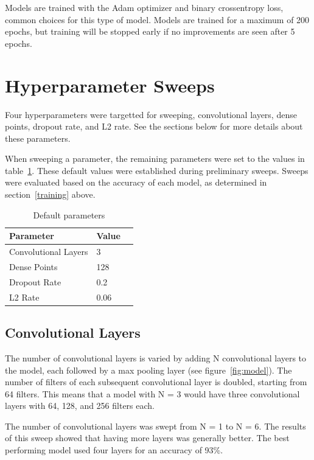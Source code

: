 \documentclass{article}
\begin{document}
Models are trained with the Adam optimizer and binary crossentropy loss, common choices for this type of model. Models are trained for a maximum of 200 epochs, but training will be stopped early if no improvements are seen after 5 epochs.


\section{Hyperparameter Sweeps}

Four hyperparameters were targetted for sweeping, convolutional layers, dense points, dropout rate, and L2 rate. See the sections below for more details about these parameters.

When sweeping a parameter, the remaining parameters were set to the values in table~\ref{parameters}. These default values were established during preliminary sweeps. Sweeps were evaluated based on the accuracy of each model, as determined in section~\ref{training} above. 

\begin{table}[H]
    \caption{Default parameters}
    \label{parameters}
    \centering
    \begin{tabular}{lll}
      \toprule
      Parameter     & Value  \\
      \midrule
      Convolutional Layers & 3     \\
      Dense Points     & 128     \\
      Dropout Rate     & 0.2  \\
      L2 Rate     & 0.06  \\
      \bottomrule
    \end{tabular}
  \end{table}


\subsection{Convolutional Layers}

The number of convolutional layers is varied by adding N convolutional layers to the model, each followed by a max pooling layer (see figure~\ref{fig:model}). The number of filters of each subsequent convolutional layer is doubled, starting from 64 filters. This means that a model with N = 3 would have three convolutional layers with 64, 128, and 256 filters each.

The number of convolutional layers was swept from N = 1 to N = 6. The results of this sweep showed that having more layers was generally better. The best performing model used four layers for an accuracy of 93\%. 
\end{document}
